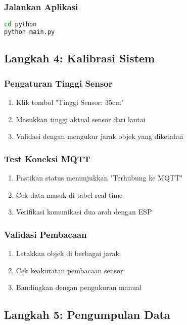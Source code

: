 \documentclass[12pt,a4paper]{article}
\begin{document}
\subsubsection{Jalankan Aplikasi}
\begin{lstlisting}[language=bash, caption=Menjalankan Aplikasi Python]
cd python
python main.py
\end{lstlisting}

\subsection{Langkah 4: Kalibrasi Sistem}

\subsubsection{Pengaturan Tinggi Sensor}
\begin{enumerate}
    \item Klik tombol "Tinggi Sensor: 35cm"
    \item Masukkan tinggi aktual sensor dari lantai
    \item Validasi dengan mengukur jarak objek yang diketahui
\end{enumerate}

\subsubsection{Test Koneksi MQTT}
\begin{enumerate}
    \item Pastikan status menunjukkan "Terhubung ke MQTT"
    \item Cek data masuk di tabel real-time
    \item Verifikasi komunikasi dua arah dengan ESP
\end{enumerate}

\subsubsection{Validasi Pembacaan}
\begin{enumerate}
    \item Letakkan objek di berbagai jarak
    \item Cek keakuratan pembacaan sensor
    \item Bandingkan dengan pengukuran manual
\end{enumerate}

\subsection{Langkah 5: Pengumpulan Data}
\end{document}
